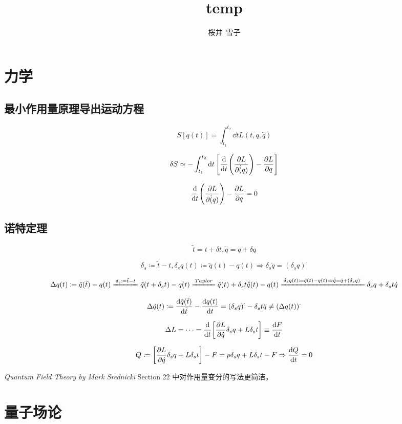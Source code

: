 \documentclass{article}
\title{temp}
\author{桜井\ 雪子}
\begin{document}
\maketitle

\section{力学}

\subsection{最小作用量原理导出运动方程}

\[ S[q(t)] = \int_{t_1}^{t_2} \dd{t} L(t, q, \dot{q}) \]

\[ \delta S \simeq - \int_{t_1}^{t_2} \dd{t} \qty[\dv{t} \qty(\pdv{L}{\dot(q)}) - \pdv{L}{q}] \]

\[ \dv{t} \qty(\pdv{L}{\dot(q)}) - \pdv{L}{q} = 0 \]

\subsection{诺特定理}

\[ \tilde{t} = t + \delta t, \tilde{q} = q + \delta q \]

\[ \delta_s \coloneqq \tilde{t} - t, \delta_s q(t) \coloneqq \tilde{q}(t) - q(t) \Rightarrow \delta_s \dot{q} = (\delta_s q)^{\cdot} \]

\[ \Delta q(t) \coloneqq \tilde{q}(\tilde{t}) - q(t) \xlongequal{\delta_s \coloneqq \tilde{t} - t}  \tilde{q}(t + \delta_s t) - q(t) \xlongequal{Taylor} \tilde{q}(t) + \delta_s t \dot{\tilde{q}}(t) - q(t) \xlongequal{\delta_s q(t) \coloneqq \tilde{q}(t) - q(t) \Rightarrow \dot{\tilde{q}} = \dot{q} + (\delta_s q)^{\cdot}} \delta_s q + \delta_s t \dot{q} \]

\[ \Delta \dot{q}(t) \coloneqq \dv{\tilde{q}(\tilde{t})}{\tilde{t}} - \dv{q(t)}{t} = \qty(\delta_s q)^{\cdot} - \delta_s t \ddot{q} \neq (\Delta q(t))^{\cdot} \]

\[ \Delta L = \cdots = \dv{t} \qty[\pdv{L}{\dot{q}} \delta_s q + L \delta_s t] \equiv \dv{F}{t} \]

\[ Q \coloneqq \qty[\pdv{L}{\dot{q}} \delta_s q + L \delta_s t] - F = p \delta_s q + L \delta_s t - F \Rightarrow \dv{Q}{t} = 0 \]

\textit{Quantum Field Theory by Mark Srednicki} Section 22 中对作用量变分的写法更简洁。

\section{量子场论}
\end{document}
